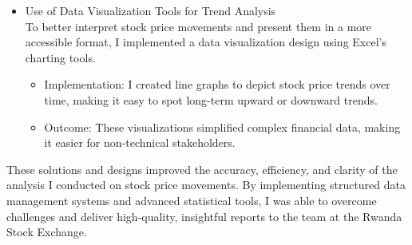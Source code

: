 \documentclass{article}
\begin{document}
\begin{titlepage}
\begin{titlepage}
\begin{flushleft}
\begin{flushleft}
\begin{itemize}
Continuous Learning and Skill Development
\begin{itemize}
    \item \underline{Design:}
Throughout my internship, I implemented a personal learning plan to improve my skills and adapt to new challenges. This involved:
\item \underline{Self-Study:}
I took online courses to further develop my skills in financial analysis, Excel, and Bloomberg Terminal usage. These courses enhanced my ability to conduct detailed financial analysis and improved my proficiency with data analysis tools.
\item \underline{On-the-Job Learning:}
I continuously sought feedback from my supervisors and senior analysts to identify areas for improvement. I also participated in internal training sessions offered by the Rwanda Stock Exchange to stay updated on industry trends and best practices in stock market analysis.
\item \underline{Outcome:}
This focus on continuous learning allowed me to enhance my technical and analytical skills over time, ensuring that I could contribute more effectively to the team and produce higher-quality reports.
\end{itemize}
\item Use of Data Visualization Tools for Trend Analysis
\\
To better interpret stock price movements and present them in a more accessible format, I implemented a data visualization design using Excel's charting tools.
\begin{itemize}
    \item Implementation:
I created line graphs to depict stock price trends over time, making it easy to spot long-term upward or downward trends.
\item Outcome:
These visualizations simplified complex financial data, making it easier for non-technical stakeholders.
\end{itemize}
\end{itemize}
\vspace{0.3cm}

These solutions and designs improved the accuracy, efficiency, and clarity of the analysis I conducted on stock price movements. By implementing structured data management systems and  advanced statistical tools, I was able to overcome challenges and deliver high-quality, insightful reports to the team at the Rwanda Stock Exchange.
\vspace{0.9cm}


\end{flushleft}
\end{flushleft}
\end{titlepage}
\end{titlepage}
\end{document}
